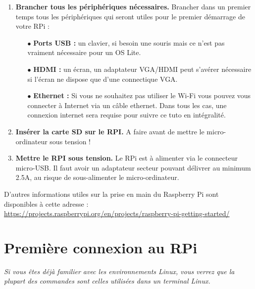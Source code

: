 \documentclass[a4paper, 10pt]{article}
\begin{document}
\begin{enumerate}
	\item\textbf{Brancher tous les périphériques nécessaires.} Brancher dans
	un premier temps tous les périphériques qui seront utiles pour le
	premier démarrage de votre RPi :
	
	\begin{itemize}
		\vspace{0.5em}
		\item[$\bullet$] \textbf{Ports USB :} un clavier, si besoin une souris
		mais ce n'est pas vraiment nécessaire pour un OS Lite.
		\vspace{0.5em}
		\item[$\bullet$] \textbf{HDMI :} un écran, un adaptateur VGA/HDMI peut
		s'avérer nécessaire si l'écran ne dispose que d'une connectique VGA.
		\vspace{0.5em}
		\item[$\bullet$] \textbf{Ethernet :} Si vous ne souhaitez pas utiliser
		le Wi-Fi vous pouvez vous connecter à Internet via un câble ethernet.
		Dans tous les cas, une connexion internet sera requise pour suivre ce
		tuto en intégralité.
		\vspace{0.5em}
	\end{itemize}
	
	\item\textbf{Insérer la carte SD sur le RPI.} A faire avant de mettre le
	micro-ordinateur sous tension !
	
	\item\textbf{Mettre le RPI sous tension.} Le RPi est à alimenter via le
	connecteur micro-USB. Il faut avoir un adaptateur secteur pouvant délivrer
	au minimum 2.5A, au risque de sous-alimenter le micro-ordinateur.
\end{enumerate}

D'autres informations utiles sur la prise en main du Raspberry Pi sont 
disponibles à cette adresse :
\url{https://projects.raspberrypi.org/en/projects/raspberry-pi-getting-started/}

\vspace{-1em}

\section{Première connexion au RPi}

\vspace{-0.5em}

\textit{Si vous êtes déjà familier avec les environnements Linux, vous 
verrez que la plupart des commandes sont celles utilisées 
dans un terminal Linux.}
\end{document}
